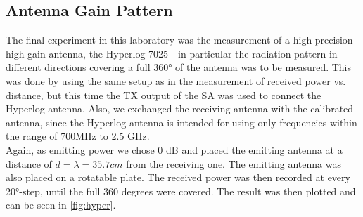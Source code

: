\subsection{Antenna Gain Pattern}
The final experiment in this laboratory was the measurement of a high-precision high-gain antenna, the Hyperlog 7025 - in particular the radiation pattern in different directions covering a full 360° of the antenna was to be measured.
This was done by using the same setup as in the measurement of received power vs. distance, but this time the TX output of the SA was used to connect the Hyperlog antenna. Also, we exchanged the receiving antenna with the calibrated antenna, since the Hyperlog antenna is intended for using only frequencies within the range of 700MHz to 2.5 GHz.\\
Again, as emitting power we chose 0 dB and placed the emitting antenna at a distance of $d = \lambda = 35.7 cm$ from the receiving one.
The emitting antenna was also placed on a rotatable plate. The received power was then recorded at every 20°-step, until the full 360 degrees were covered. The result was then plotted and can be seen in \cref{fig:hyper}.

